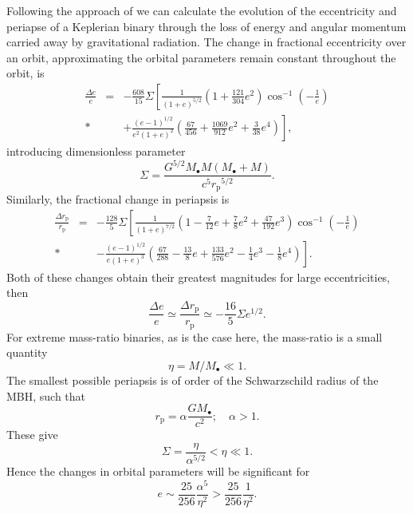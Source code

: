 \documentclass[useAMS,usedcolumn,usegraphicx,usenatbib]{mn2e}
\newcommand{\sub}[1]{\ensuremath{_\mathrm{#1}}}
\newcommand{\recip}[1]{\ensuremath{\frac{1}{#1}}}
\begin{document}
Following the approach of \citet{Turner1977} we can calculate the evolution of the eccentricity and periapse of a Keplerian binary through the loss of energy and angular momentum carried away by gravitational radiation. The change in fractional eccentricity over an orbit, approximating the orbital parameters remain constant throughout the orbit, is
\begin{eqnarray}
\frac{\Delta e}{e} &=& -\frac{608}{15}\Sigma\left[\recip{(1+e)^{5/2}}\left(1 + \frac{121}{304}e^2\right)\cos^{-1}\left(-\recip{e}\right)\right. \nonumber\\*
 & & \left. + \frac{(e - 1)^{1/2}}{e^2(1+e)^2}\left(\frac{67}{456} + \frac{1069}{912}e^2 + \frac{3}{38}e^4\right)\right],
\end{eqnarray}
introducing dimensionless parameter
\begin{equation}
\Sigma = \frac{G^{5/2}M_\bullet M(M_\bullet+ M)}{c^5r\sub{p}^{5/2}}.
\end{equation}
Similarly, the fractional change in periapsis is
\begin{eqnarray}
\frac{\Delta r\sub{p}}{r\sub{p}} &=& -\frac{128}{5}\Sigma\left[\recip{(1+e)^{7/2}}\left(1 - \frac{7}{12}e + \frac{7}{8}e^2 + \frac{47}{192}e^3\right)\cos^{-1}\left(-\recip{e}\right)\right. \nonumber \\*
 & & \left. - \frac{(e - 1)^{1/2}}{e(1 + e)^3}\left(\frac{67}{288} - \frac{13}{8}e + \frac{133}{576}e^2 - \frac{1}{4}e^3 - \frac{1}{8}e^4\right)\right].
\end{eqnarray}
Both of these changes obtain their greatest magnitudes for large eccentricities, then
\begin{equation}
\frac{\Delta e}{e} \simeq \frac{\Delta r\sub{p}}{r\sub{p}} \simeq -\frac{16}{5}\Sigma e^{1/2}.
\end{equation}
For extreme mass-ratio binaries, as is the case here, the mass-ratio is a small quantity
\begin{equation}
\eta = M/M_\bullet \ll 1.
\end{equation}
The smallest possible periapsis is of order of the Schwarzschild radius of the MBH, such that 
\begin{equation}
r\sub{p} = \alpha\frac{GM_\bullet}{c^2}; \quad \alpha > 1.
\end{equation}
These give
\begin{equation}
\Sigma = \frac{\eta}{\alpha^{5/2}} < \eta \ll 1.
\end{equation}
Hence the changes in orbital parameters will be significant for
\begin{equation}
e \sim \frac{25}{256}\frac{\alpha^5}{\eta^2} > \frac{25}{256}\recip{\eta^2}.
\end{equation}

\bsp

\label{lastpage}
\end{document}
